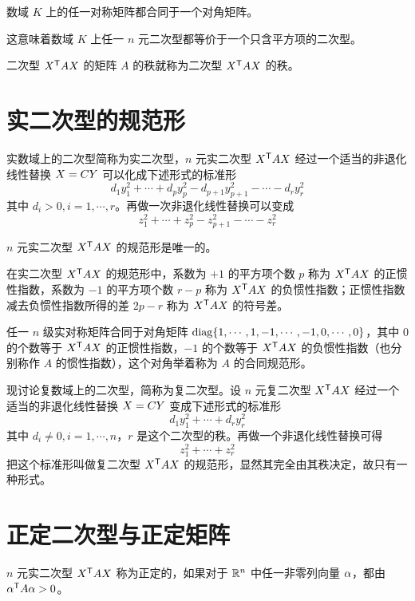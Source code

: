 \begin{theorem}
    数域 $K$ 上的任一对称矩阵都合同于一个对角矩阵。
\end{theorem}

这意味着数域 $K$ 上任一 $n$ 元二次型都等价于一个只含平方项的二次型。

二次型 ${X}^\mathsf{T}AX$ 的矩阵 $A$ 的秩就称为二次型 ${X}^\mathsf{T}AX$ 的秩。

\section{实二次型的规范形}

实数域上的二次型简称为实二次型，$n$ 元实二次型 ${X}^\mathsf{T}AX$ 经过一个适当的非退化线性替换 $X = CY$ 可以化成下述形式的标准形
\[d_1y_1^2+\cdots+d_py_p^2-d_{p+1}y_{p+1}^2-\cdots-d_ry_r^2\]
其中 $d_i>0,i=1,\cdots,r$。再做一次非退化线性替换可以变成
\[z_1^2+\cdots+z_p^2-z_{p+1}^2-\cdots-z_r^2\]

\begin{theorem}
    $n$ 元实二次型 ${X}^\mathsf{T}AX$ 的规范形是唯一的。
\end{theorem}

\begin{definition}
    在实二次型 ${X}^\mathsf{T}AX$ 的规范形中，系数为 $+1$ 的平方项个数 $p$ 称为 ${X}^\mathsf{T}AX$ 的正惯性指数，系数为 $-1$ 的平方项个数 $r-p$ 称为 ${X}^\mathsf{T}AX$ 的负惯性指数；正惯性指数减去负惯性指数所得的差 $2p-r$ 称为 ${X}^\mathsf{T}AX$ 的符号差。
\end{definition}

任一 $n$ 级实对称矩阵合同于对角矩阵 $\operatorname{diag}\{1,\cdots,1,-1,\cdots,-1,0,\cdots,0\}$，其中 $0$ 的个数等于 ${X}^\mathsf{T}AX$ 的正惯性指数，$-1$ 的个数等于 ${X}^\mathsf{T}AX$ 的负惯性指数（也分别称作 $A$ 的惯性指数），这个对角举着称为 $A$ 的合同规范形。

现讨论复数域上的二次型，简称为复二次型。设 $n$ 元复二次型 ${X}^\mathsf{T}AX$ 经过一个适当的非退化线性替换 $X = CY$ 变成下述形式的标准形
\[d_1y_1^2+\cdots+d_ry_r^2\]
其中 $d_i\ne 0,i=1,\cdots,n$，$r$ 是这个二次型的秩。再做一个非退化线性替换可得
\[z_1^2+\cdots+z_r^2\]
把这个标准形叫做复二次型 ${X}^\mathsf{T}AX$ 的规范形，显然其完全由其秩决定，故只有一种形式。

\section{正定二次型与正定矩阵}

\begin{definition}
    $n$ 元实二次型 ${X}^\mathsf{T}AX$ 称为正定的，如果对于 $\mathbb{R}^n$ 中任一非零列向量 $\alpha$，都由 ${\alpha}^\mathsf{T}A\alpha>0$。
\end{definition}

